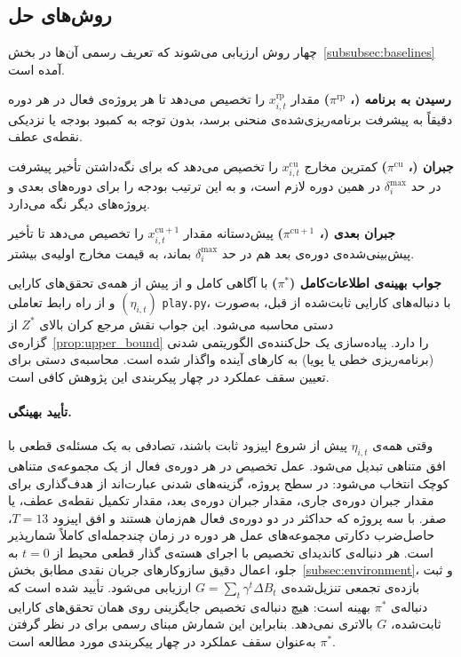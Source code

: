\subsection{روش‌های حل}
\label{subsec:solvers}

چهار روش ارزیابی می‌شوند که تعریف رسمی آن‌ها در
بخش~\ref{subsubsec:baselines} آمده است.

\textbf{رسیدن به برنامه (، $\pi^{\mathrm{rp}}$)} مقدار
$x^{\mathrm{rp}}_{i,t}$ را تخصیص می‌دهد تا هر پروژه‌ی فعال در هر دوره
دقیقاً به پیشرفت برنامه‌ریزی‌شده‌ی منحنی  برسد، بدون توجه به
کمبود بودجه یا نزدیکی نقطه‌ی عطف.

\textbf{جبران  (، $\pi^{\mathrm{cu}}$)} کمترین
مخارج $x^{\mathrm{cu}}_{i,t}$ را تخصیص می‌دهد که برای نگه‌داشتن تأخیر
پیشرفت در حد $\delta^{\max}_i$ در همین دوره لازم است، و به این ترتیب
بودجه را برای دوره‌های بعدی و پروژه‌های دیگر نگه می‌دارد.

\textbf{جبران  بعدی (، $\pi^{\mathrm{cu}+1}$)}
پیش‌دستانه مقدار $x^{\mathrm{cu}+1}_{i,t}$ را تخصیص می‌دهد تا تأخیر
پیش‌بینی‌شده‌ی دوره‌ی بعد هم در حد $\delta^{\max}_i$ بماند، به قیمت
مخارج اولیه‌ی بیشتر.

\textbf{جواب بهینه‌ی اطلاعات‌کامل ($\pi^*$)} با آگاهی کامل و از پیش از
همه‌ی تحقق‌های کارایی $(\eta_{i,t})$ و از راه رابط تعاملی
\texttt{play.py}، با دنباله‌های کارایی ثابت‌شده از قبل، به‌صورت دستی
محاسبه می‌شود. این جواب نقش مرجع کران بالای $Z^*$ از
گزاره‌ی~\ref{prop:upper_bound} را دارد. پیاده‌سازی یک حل‌کننده‌ی
الگوریتمی شدنی (برنامه‌ریزی خطی یا پویا) به کارهای آینده واگذار شده
است. محاسبه‌ی دستی برای تعیین سقف عملکرد در چهار پیکربندی این پژوهش
کافی است.

\paragraph{تأیید بهینگی.}
وقتی همه‌ی $\eta_{i,t}$ پیش از شروع اپیزود ثابت باشند، 
تصادفی به یک مسئله‌ی قطعی با افق متناهی تبدیل می‌شود. عمل تخصیص در
هر دوره‌ی فعال از یک مجموعه‌ی متناهی کوچک انتخاب می‌شود: در سطح
پروژه، گزینه‌های شدنی عبارت‌اند از هدف‌گذاری برای مقدار جبران دوره‌ی
جاری، مقدار جبران دوره‌ی بعد، مقدار تکمیل نقطه‌ی عطف، یا صفر. با سه
پروژه که حداکثر در دو دوره‌ی فعال هم‌زمان هستند و افق اپیزود $T = 13$،
حاصل‌ضرب دکارتی مجموعه‌های عمل هر دوره در زمان چندجمله‌ای کاملاً
شمارپذیر است. هر دنباله‌ی کاندیدای تخصیص با اجرای هسته‌ی گذار قطعی
محیط از $t = 0$ به جلو، اعمال دقیق سازوکارهای جریان نقدی 
مطابق بخش~\ref{subsec:environment}، و ثبت بازده‌ی تجمعی تنزیل‌شده‌ی
$G = \sum_{t} \gamma^t \Delta B_t$ ارزیابی می‌شود. تأیید شده است که
دنباله‌ی $\pi^*$ بهینه است: هیچ دنباله‌ی تخصیص جایگزینی روی همان
تحقق‌های کارایی ثابت‌شده، $G$ بالاتری نمی‌دهد. بنابراین این شمارش
مبنای رسمی برای در نظر گرفتن $\pi^*$ به‌عنوان سقف عملکرد در چهار
پیکربندی مورد مطالعه است.

